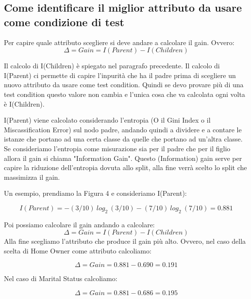 \documentclass[14pt]{extreport}
\begin{document}
    
\subsection{Come identificare il miglior attributo da usare come condizione di test}

Per capire quale attributo scegliere si deve andare a calcolare il \b{gain}. Ovvero:
\begin{equation}
    \Delta = Gain = I(Parent) - I(Children)
\end{equation}

Il calcolo di I(Children) è spiegato nel paragrafo precedente. 
Il calcolo di I(Parent) ci permette di capire l'inpurità che ha il padre prima di scegliere un nuovo attributo da usare come test condition. Quindi se devo provare più di una test condition questo valore non cambia e l'unica cosa che va calcolata ogni volta è I(Children).

I(Parent) viene calcolato considerando l'entropia (O il Gini Index o il Miscassification Error) sul nodo padre, andando quindi a dividere e a contare le istanze che portano ad una certa classe da quelle che portano ad un'altra classe.
Se consideriamo l'entropia come misurazione sia per il padre che per il figlio allora il gain si chiama "Information Gain".
Questo (Information) gain serve per capire la riduzione dell'entropia dovuta allo split, alla fine verrà scelto lo split che massimizza il gain.

Un esempio, prendiamo la Figura 4 e consideriamo I(Parent):

\begin{equation}  
    I(Parent) = - (3/10)\ log_2\ (3/10) - (7/10)\ log_2\ (7/10) = 0.881
\end{equation}

Poi possiamo calcolare il gain andando a calcolare:
\begin{equation}
    \Delta = Gain = I(Parent) - I(Children)
\end{equation}
Alla fine scegliamo l'attributo che produce il gain più alto.
Ovvero, nel caso della scelta di Home Owner come attributo calcoliamo:

\begin{equation}
    \Delta = Gain = 0.881 - 0.690 = 0.191
\end{equation}

Nel caso di Marital Status calcoliamo:


\begin{equation}
    \Delta = Gain = 0.881 - 0.686 = 0.195
\end{equation}
\end{document}

